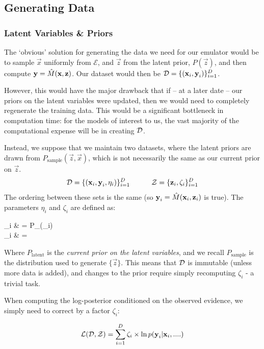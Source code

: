 \subsection{Generating Data}


	\subsubsection{Latent Variables \& Priors}

		The `obvious' solution for generating the data we need for our emulator would be to sample $\vec{x}$ uniformly from $\mathcal{E}$, and $\vec{z}$ from the latent prior, $P(\vec{z})$, and then compute $\mathbf{\boldsymbol{\mathrm{y}}} = \hat{M}(\mathbf{\boldsymbol{\mathrm{x}}}, \mathbf{\boldsymbol{\mathrm{z}}})$. Our dataset would then be $\mathcal{D} =  \{(\mathbf{\boldsymbol{\mathrm{x}}}_i, \mathbf{\boldsymbol{\mathrm{y}}} _i)\}_{i=1}^{D}$.

		However, this would have the major drawback that if -- at a later date -- our priors on the latent variables were updated, then we would need to completely regenerate the training data. This would be a significant bottleneck in computation time: for the models of interest to us, the vast majority of the computational expense will be in creating $\mathcal{D}$.

		Instead, we suppose that we maintain two datasets, where the latent priors are drawn from $P_\text{sample}(\vec{z},\vec{x})$, which is not necessarily the same as our current prior on $\vec{z}$.
		\begin{equation}
			\mathcal{D} = \{(\mathbf{\boldsymbol{\mathrm{x}}}_i, \mathbf{\boldsymbol{\mathrm{y}}}_i, \eta_i)\}_{i=1}^{D}~~~\quad~~~\mathcal{Z} = \{ \mathbf{\boldsymbol{\mathrm{z}}}_i, \zeta_i \}_{i=1}^D
		\end{equation}
		The ordering between these sets is the same (so $\mathbf{\boldsymbol{\mathrm{y}}}_i = \hat{M}(\mathbf{\boldsymbol{\mathrm{x}}}_i, \mathbf{\boldsymbol{\mathrm{z}}}_i)$ is true). The parameters $\eta_i$ and $\zeta_i$ are defined as:
		\begin{spalign}
			\eta_i & = P_(_i)
			\\
			\zeta_i & =  \label{E:DefineWeights}
		\end{spalign}
		Where  $P_\text{latent}$ is the \textit{current prior on the latent variables}, and we recall $P_\text{sample}$ is the distribution used to generate $\{\vec{z}\}$. This means that $\mathcal{D}$ is immutable (unless more data is added), and changes to the prior require simply recomputing $\zeta_i$ - a trivial task.

		When computing the log-posterior conditioned on the observed evidence, we simply need to correct by a factor $\zeta_i$:

		\begin{equation}
			\mathcal{L}(\mathcal{D}, \mathcal{Z}) = \sum_{i=1}^D \zeta_i \times \ln p(\mathbf{\boldsymbol{\mathrm{y}}}_i | \mathbf{\boldsymbol{\mathrm{x}}}_i,....)
		\end{equation}


